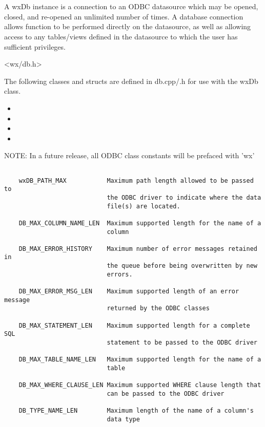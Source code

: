 \section{}\label{wxdb}

A wxDb instance is a connection to an ODBC datasource which may
be opened, closed, and re-opened an unlimited number of times.  A
database connection allows function to be performed directly on the
datasource, as well as allowing access to any tables/views defined in
the datasource to which the user has sufficient privileges.


<wx/db.h>


The following classes and structs are defined in db.cpp/.h for use with the wxDb class.

\begin{itemize}\itemsep=0pt
\item {}
\item {}
\item {}
\item {}
\end{itemize}


NOTE: In a future release, all ODBC class constants will be prefaced with 'wx'

\begin{verbatim}

    wxDB_PATH_MAX           Maximum path length allowed to be passed to
                            the ODBC driver to indicate where the data 
                            file(s) are located.

    DB_MAX_COLUMN_NAME_LEN  Maximum supported length for the name of a 
                            column

    DB_MAX_ERROR_HISTORY    Maximum number of error messages retained in 
                            the queue before being overwritten by new 
                            errors.

    DB_MAX_ERROR_MSG_LEN    Maximum supported length of an error message 
                            returned by the ODBC classes

    DB_MAX_STATEMENT_LEN    Maximum supported length for a complete SQL 
                            statement to be passed to the ODBC driver

    DB_MAX_TABLE_NAME_LEN   Maximum supported length for the name of a 
                            table

    DB_MAX_WHERE_CLAUSE_LEN Maximum supported WHERE clause length that 
                            can be passed to the ODBC driver

    DB_TYPE_NAME_LEN        Maximum length of the name of a column's 
                            data type
\end{verbatim}


